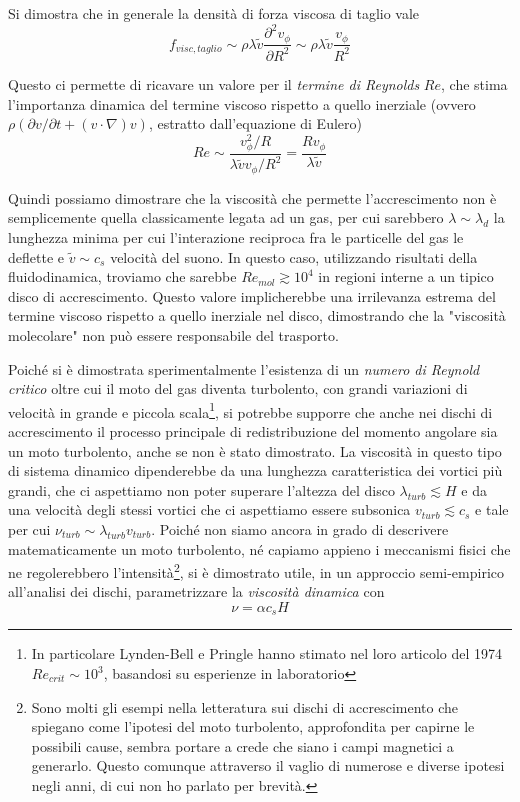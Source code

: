 \documentclass[a4paperbi]{article}
\begin{document}
	Si dimostra che in generale la densità di forza viscosa di taglio vale
	\begin{equation}
		f_{visc,taglio}\sim\rho\lambda\tilde{v}\frac{\partial^2v_\phi}{\partial R^2}\sim\rho\lambda\tilde{v}\frac{v_\phi}{R^2}
	\end{equation}

	Questo ci permette di ricavare un valore per il \textit{termine di Reynolds} $Re$, che stima l'importanza dinamica del termine viscoso rispetto a quello inerziale (ovvero $\rho(\partial\textit{v}/\partial t+(\textit{v}\cdot\nabla)\textit{v})$, estratto dall'equazione di Eulero)
	\begin{equation}
		Re\sim\frac{v_\phi^2/R}{\lambda\tilde{v}v_\phi/R^2}=\frac{Rv_\phi}{\lambda\tilde{v}}
	\end{equation}
	
	Quindi possiamo dimostrare che la viscosità che permette l'accrescimento non è semplicemente quella classicamente legata ad un gas, per cui sarebbero $\lambda\sim\lambda_d$ la lunghezza minima per cui l'interazione reciproca fra le particelle del gas le deflette e $\tilde{v}\sim c_s$ velocità del suono. In questo caso, utilizzando risultati della fluidodinamica, troviamo che sarebbe $Re_{mol}\gtrsim10^4$ in regioni interne a un tipico disco di accrescimento. Questo valore implicherebbe una irrilevanza estrema del termine viscoso rispetto a quello inerziale nel disco, dimostrando che la "viscosità molecolare" non può essere responsabile del trasporto.
	
	Poiché si è dimostrata sperimentalmente l'esistenza di un \textit{numero di Reynold critico} oltre cui il moto del gas diventa turbolento, con grandi variazioni di velocità in grande e piccola scala\footnote{In particolare Lynden-Bell e Pringle hanno stimato nel loro articolo del 1974 $Re_{crit}\sim 10^3$, basandosi su esperienze in laboratorio}, si potrebbe supporre che anche nei dischi di accrescimento il processo principale di redistribuzione del momento angolare sia un moto turbolento, anche se non è stato dimostrato.
	La viscosità in questo tipo di sistema dinamico dipenderebbe da una lunghezza caratteristica dei vortici più grandi, che ci aspettiamo non poter superare l'altezza del disco $\lambda_{turb}\lesssim H$ e da una velocità degli stessi vortici che ci aspettiamo essere subsonica $v_{turb}\lesssim c_s$ e tale per cui $\nu_{turb}\sim \lambda_{turb}v_{turb}$.
	Poiché non siamo ancora in grado di descrivere matematicamente un moto turbolento, né capiamo appieno i meccanismi fisici che ne regolerebbero l'intensità\footnote{Sono molti gli esempi nella letteratura sui dischi di accrescimento che spiegano come l'ipotesi del moto turbolento, approfondita per capirne le possibili cause, sembra portare a crede che siano i campi magnetici a generarlo. Questo comunque attraverso il vaglio di numerose e diverse ipotesi negli anni, di cui non ho parlato per brevità.}, si è dimostrato utile, in un approccio semi-empirico all'analisi dei dischi, parametrizzare la \textit{viscosità dinamica} con
	\begin{equation}
		\nu=\alpha c_s H
	\end{equation}
	
\end{document}

